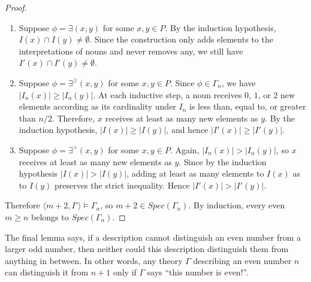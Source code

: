 \documentclass[12pt, reqno]{amsart}
\theoremstyle{definition}
\theoremstyle{remark}
\numberwithin{equation}{section}
\begin{document}
\begin{proof}
\begin{enumerate}
	If $|I_n(x)|>n/2$, then $I_n(x)\subseteq I_n(y)$ implies $|I_n(y)|>n/2$. Hence both new elements are added to both $I(x)$ and $I(y)$, so the inclusion is preserved.

	Finally, suppose $|I_n(x)|=n/2$. Since $I_n(x)\subseteq I_n(y)$, either $|I_n(y)|>n/2$, in which case both new elements are added to $I(y)$, or $|I_n(y)|=n/2$. In the latter case, $I_n(x)\subseteq I_n(y)$ and $|I_n(x)|=|I_n(y)|$ imply $I_n(x)=I_n(y)$. Since $I_n$ is a bijection, $x=y$, so the same new element is added to both sides. Thus in every case $I'(x)\subseteq I'(y)$.

	\item Suppose $\phi=\exists(x,y)$ for some $x,y\in P$. By the induction hypothesis, $I(x)\cap I(y)\neq\emptyset$. Since the construction only adds elements to the interpretations of nouns and never removes any, we still have $I'(x)\cap I'(y)\neq\emptyset$.

	\item Suppose $\phi=\exists^{\geq}(x,y)$ for some $x,y\in P$. Since $\phi\in\Gamma_n$, we have $|I_n(x)|\geq|I_n(y)|$. At each inductive step, a noun receives $0$, $1$, or $2$ new elements according as its cardinality under $I_n$ is less than, equal to, or greater than $n/2$. Therefore, $x$ receives at least as many new elements as $y$. By the induction hypothesis, $|I(x)|\geq|I(y)|$, and hence $|I'(x)|\geq|I'(y)|$.

	\item Suppose $\phi=\exists^{>}(x,y)$ for some $x,y\in P$. Again, $|I_n(x)|>|I_n(y)|$, so $x$ receives at least as many new elements as $y$. Since by the induction hypothesis $|I(x)|>|I(y)|$, adding at least as many elements to $I(x)$ as to $I(y)$ preserves the strict inequality. Hence $|I'(x)|>|I'(y)|$.
\end{enumerate}

Therefore $\langle m+2,I'\rangle\models\Gamma_n$, so $m+2\in Spec(\Gamma_n)$. By induction, every even $m\geq n$ belongs to $Spec(\Gamma_n)$.

\end{proof}


The final lemma says, if a description cannot distinguish an even number from a larger odd number, then neither could this description distinguish them from anything in between. In other words, any theory $\Gamma$ describing an even number $n$ can distinguish it from $n+1$ only if $\Gamma$ says ``this number is even!''.
\end{document}
